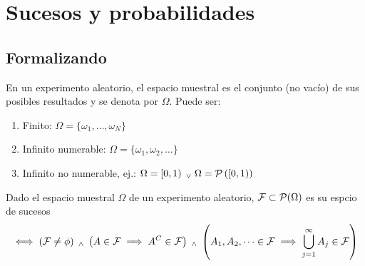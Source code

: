 \vspace{-1.5cm}
\section{Sucesos y probabilidades}
\subsection{Formalizando}
\begin{defn}
	En un experimento aleatorio, el espacio muestral es el conjunto (no vacío) de sus posibles resultados y se denota por $\Omega$. Puede ser:
	\begin{enumerate}[topsep=1pt, itemsep=1pt,parsep=3pt]
		\item Finito: $\Omega = \{\omega_1, \dots, \omega_N\}$
		\item Infinito numerable: $\Omega = \{\omega_1, \omega_2, \dots\}$
		\item Infinito no numerable, ej.: $\Omega = \left[0, 1\right) \; _{\vee} \; \Omega =
			      \mathcal{P}\left(\left[0, 1\right)\right)$
	\end{enumerate}
\end{defn}
\begin{defn}
	Dado el espacio muestral $\Omega$ de un experimento aleatorio, $\mathcal{F} \subset \mathcal{P}(\Omega)$ es su espcio de sucesos
	\[\iff \left(\mathcal{F} \ne \phi\right) \; _{\wedge} \; \left(A \in \mathcal{F} \implies A^C \in \mathcal{F}\right) \; _{\wedge} \; \left(A_1,A_2, \dots \in \mathcal{F} \implies \bigcup_{j=1}^{\infty} A_j \in \mathcal{F}\right)\]
\end{defn}


